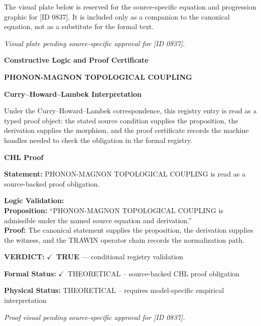 \begingroup\footnotesize\sloppy
The visual plate below is reserved for the source-specific equation and progression graphic for [ID 0837]. It is included only as a companion to the canonical equation, not as a substitute for the formal text.
\par\endgroup
\begingroup\footnotesize\itshape
Visual plate pending source-specific approval for [ID 0837].
\par\endgroup

\clearpage
\begingroup\tzpsupportsetup
\noindent\textbf{\fontsize{10.8pt}{12.8pt}\selectfont [ID 0837] Constructive Logic and Proof Certificate}\par
\noindent\textbf{\fontsize{10pt}{12pt}\selectfont PHONON-MAGNON TOPOLOGICAL COUPLING}\par
\vspace{0.45em}
\begingroup
\footnotesize
\setlength{\parskip}{0.22em}
\setlength{\parindent}{0pt}
\noindent\textbf{Curry--Howard--Lambek Interpretation}\par
Under the Curry--Howard--Lambek correspondence, this registry entry is read as a typed proof
object: the stated source condition supplies the proposition, the derivation supplies the
morphism, and the proof certificate records the machine handles needed to check the obligation
in the formal registry.

\vspace{0.45em}
\noindent\textbf{CHL Proof}\par
\textbf{Statement:} PHONON-MAGNON TOPOLOGICAL COUPLING is read as a source-backed proof obligation.

\textbf{Logic Validation:}\\
\textbf{Proposition:} ``PHONON-MAGNON TOPOLOGICAL COUPLING is admissible under the named source equation and derivation.''\\
\textbf{Proof:} The canonical statement supplies the proposition, the derivation supplies the witness, and the TRAWIN operator chain records the normalization path.

\textbf{VERDICT:} \ensuremath{\checkmark}\ \textbf{TRUE} --- conditional registry validation

\textbf{Formal Status:} \ensuremath{\checkmark}\ THEORETICAL -- source-backed CHL proof obligation

\textbf{Physical Status:} THEORETICAL -- requires model-specific empirical interpretation
\par\vspace{0.45em}
\par
\vfill
\begingroup\footnotesize\itshape
Proof visual pending source-specific approval for [ID 0837].
\par\endgroup
\vfill
\endgroup
\endgroup
